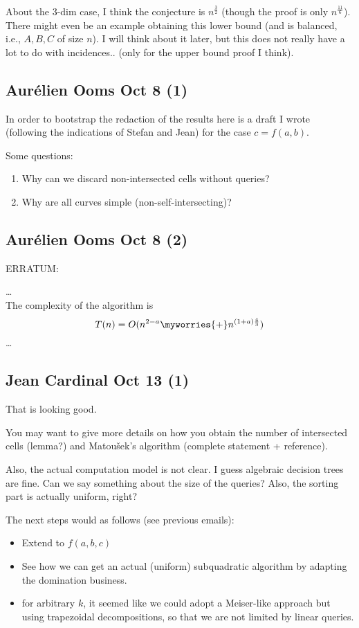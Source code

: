 About the 3-dim case, I think the conjecture is $n^{\frac{3}{2}}$ (though the proof
is only $n^{\frac{11}{6}}$).
There might even be an example obtaining this lower bound (and is balanced,
i.e., $A,B,C$ of size $n$). I will think about it later, but this does not
really have a lot to do with incidences.. (only for the upper bound proof I
think).

\subsection{Aurélien Ooms Oct 8 (1)}
In order to bootstrap the redaction of the results
here is a draft I wrote (following the indications of Stefan and Jean) for
the case $c=f(a,b)$.

Some questions:

\begin{enumerate}
	\item Why can we discard non-intersected cells without queries?
	\item Why are all curves simple (non-self-intersecting)?
\end{enumerate}

\subsection{Aurélien Ooms Oct 8 (2)}
ERRATUM:
\begin{displayquote}
\dots\\
The complexity of the algorithm is
$$T(n) = O(n^{2-a} \myworries{+} n^{(1+a)\frac{4}{3}})$$
\dots
\end{displayquote}

\subsection{Jean Cardinal Oct 13 (1)}
That is looking good.

You may want to give more details on how you obtain the number of
intersected cells (lemma?) and Matou\v{s}ek's algorithm (complete statement +
reference).

Also, the actual computation model is not clear. I guess algebraic decision
trees are fine. Can we say something about the size of the queries? Also,
the sorting part is actually uniform, right?

The next steps would as follows (see previous emails):
\begin{itemize}
	\item Extend to $f(a,b,c)$
	\item See how we can get an actual (uniform) subquadratic algorithm by adapting
the domination business.
\item for arbitrary $k$, it seemed like we could adopt a Meiser-like approach but
using trapezoidal decompositions, so that we are not limited by linear
queries.
\end{itemize}

